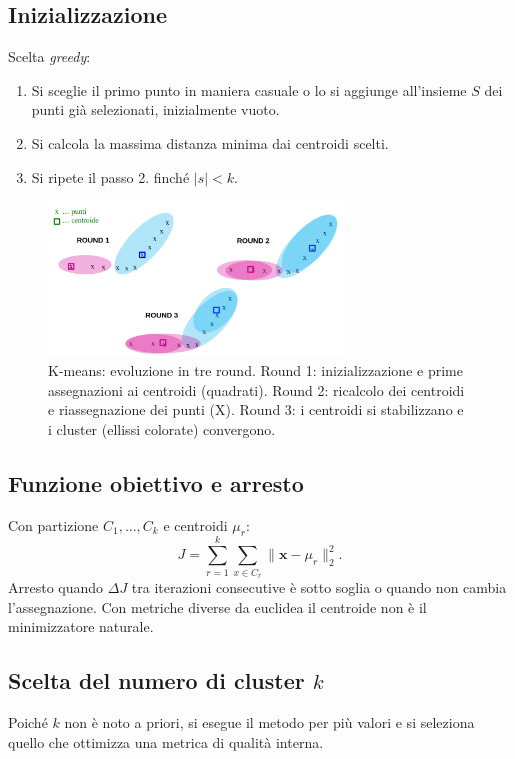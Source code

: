 \subsection{Inizializzazione}\label{subsec:init}
Scelta \emph{greedy}:
\begin{enumerate}
  \item Si sceglie il primo punto in maniera casuale o lo si aggiunge all'insieme $S$ dei punti già selezionati, inizialmente vuoto.
  \item Si calcola la massima distanza minima dai centroidi scelti.
  \item Si ripete il passo 2. finché $|s| < k$.
\end{enumerate}

\begin{figure}[htpb]
  \centering
  \includegraphics[width=0.7\textwidth]{images/k-means.png}
  \caption{K-means: evoluzione in tre round. 
  Round 1: inizializzazione e prime assegnazioni ai centroidi (quadrati). 
  Round 2: ricalcolo dei centroidi e riassegnazione dei punti (X). 
  Round 3: i centroidi si stabilizzano e i cluster (ellissi colorate) convergono.}
  \label{fig:k-means-example}
\end{figure}

\subsection{Funzione obiettivo e arresto}\label{subsec:objective}
Con partizione $C_1,\dots,C_k$ e centroidi $\mu_r$:
\[
J=\sum_{r=1}^k \sum_{x\in C_r} \|\mathbf{x}-\mu_r\|_2^2.
\]
Arresto quando $\Delta J$ tra iterazioni consecutive è sotto soglia o quando non cambia l’assegnazione. Con metriche diverse da euclidea il centroide non è il minimizzatore naturale.

\subsection{Scelta del numero di cluster $k$}\label{subsec:scelta-k}
Poiché $k$ non è noto a priori, si esegue il metodo per più valori e si seleziona quello che ottimizza una metrica di qualità interna.

